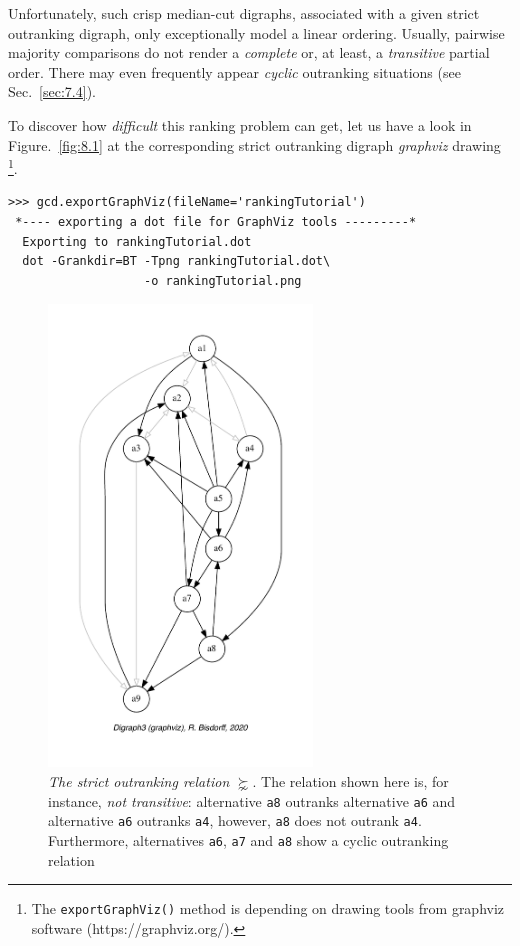Unfortunately, such crisp median-cut \Condorcet digraphs, associated with a given strict outranking digraph, only exceptionally model a linear ordering. Usually, pairwise majority comparisons do not render a \emph{complete} or, at least, a \emph{transitive} partial order. There may even frequently appear \emph{cyclic} outranking situations (see Sec.~\ref{sec:7.4}).

To discover how \emph{difficult} this ranking problem can get, let us have a look in Figure.~\vref{fig:8.1} at the corresponding strict outranking digraph \emph{graphviz} drawing \footnote{ The \texttt{exportGraphViz()} method is depending on drawing tools from graphviz software (https://graphviz.org/).}.
\begin{lstlisting}
>>> gcd.exportGraphViz(fileName='rankingTutorial')
 *---- exporting a dot file for GraphViz tools ---------*
  Exporting to rankingTutorial.dot
  dot -Grankdir=BT -Tpng rankingTutorial.dot\
                   -o rankingTutorial.png
\end{lstlisting}
\begin{figure}[ht]
\sidecaption[t]
\includegraphics[width=7cm]{Figures/8-1-rankingTutorial.pdf}
\caption[The strict outranking relation $\succnsim$]{\emph{The strict outranking relation} $\succnsim$. The relation shown here is, for instance, \emph{not transitive}: alternative \texttt{a8} outranks alternative \texttt{a6} and alternative \texttt{a6} outranks \texttt{a4}, however, \texttt{a8} does not outrank \texttt{a4}. Furthermore, alternatives \texttt{a6}, \texttt{a7} and \texttt{a8} show a cyclic outranking relation}
\label{fig:8.1}       %
\end{figure}

